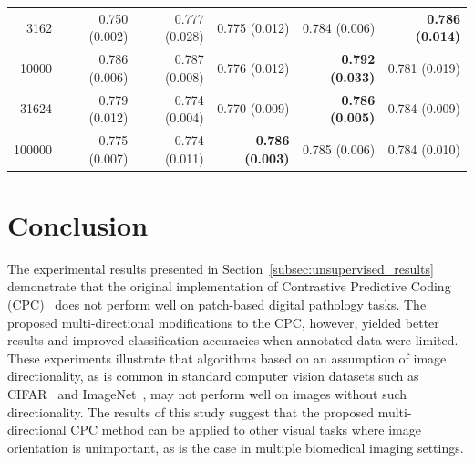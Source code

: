 \begin{table}[t]
{\begin{tabular}{r|rrrrr}
			3162   & 0.750 (0.002) & 0.777 (0.028)          & 0.775 (0.012)          & 0.784 (0.006)          & \textbf{0.786 (0.014)} \\
			10000  & 0.786 (0.006) & 0.787 (0.008)          & 0.776 (0.012)          & \textbf{0.792 (0.033)} & 0.781 (0.019)          \\
			31624  & 0.779 (0.012) & 0.774 (0.004)          & 0.770 (0.009)          & \textbf{0.786 (0.005)} & 0.784 (0.009)          \\
			100000 & 0.775 (0.007) & 0.774 (0.011)          & \textbf{0.786 (0.003)} & 0.785 (0.006)          & 0.784 (0.010)
		\end{tabular}%
	}
\end{table}


\section{Conclusion}
\label{sec:conclusion}
The experimental results presented in Section~\ref{subsec:unsupervised_results} demonstrate that the original implementation of Contrastive Predictive Coding (CPC)~\citep{oord2018representation} does not perform well on patch-based digital pathology tasks. The proposed multi-directional modifications to the CPC, however, yielded better results and improved classification accuracies when annotated data were limited. These experiments illustrate that algorithms based on an assumption of image directionality, as is common in standard computer vision datasets such as CIFAR~\citep{krizhevsky2009learning} and ImageNet~\citep{deng2009imagenet}, may not perform well on images without such directionality. The results of this study suggest that the proposed multi-directional CPC method can be applied to other visual tasks where image orientation is unimportant, as is the case in multiple biomedical imaging settings.